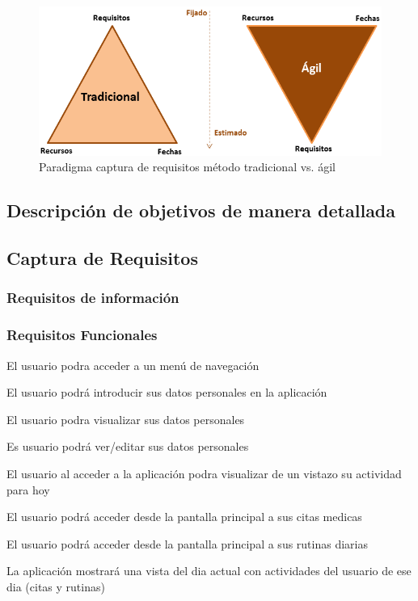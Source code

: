 \documentclass[../pfc.tex]{subfiles}
\begin{document}
	\begin{figure}
		\centering
		\includegraphics[width=0.5\linewidth]{../images/paradigmaRequisitos}
		\caption{Paradigma captura de requisitos método tradicional vs. ágil}
		\label{fig:paradigmaRequisitos}
	\end{figure}
			
			
			\subsection{Descripción de objetivos de manera detallada}
	
	\subsection{Captura de Requisitos}
	
	\subsubsection{Requisitos de información}
			
	
	\subsubsection{Requisitos Funcionales}
	
	
	El usuario podra acceder a un menú de navegación
	
	
	El usuario podrá introducir sus datos personales en la aplicación
	
	El usuario podra visualizar sus datos personales
	
	Es usuario podrá ver/editar sus datos personales
	
	
	
	El usuario al acceder a la aplicación podra visualizar de un vistazo su actividad para hoy
	
	El usuario podrá acceder desde la pantalla principal a sus citas medicas
	
	El usuario podrá acceder desde la pantalla principal a sus rutinas diarias						
	
	
	
	La aplicación mostrará una vista del dia actual con actividades del usuario de ese dia (citas y rutinas)
	
\end{document}
